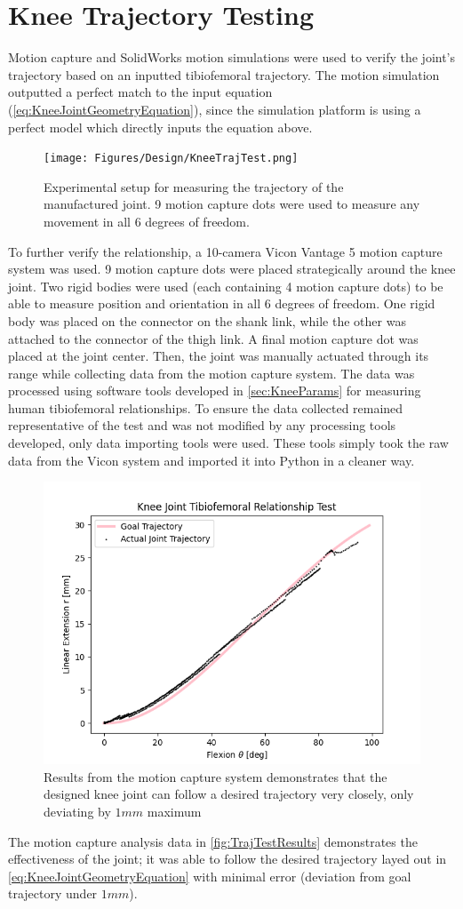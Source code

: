 \section{Knee Trajectory Testing}
Motion capture and SolidWorks motion simulations were used to verify the joint's trajectory based on an inputted tibiofemoral trajectory. The motion simulation outputted a perfect match to the input equation (\autoref{eq:KneeJointGeometryEquation}), since the simulation platform is using a perfect model which directly inputs the equation above.

\begin{figure}[ht!]
    \centering
    \texttt{[image: Figures/Design/KneeTrajTest.png]}
    \caption{Experimental setup for measuring the trajectory of the manufactured joint. 9 motion capture dots were used to measure any movement in all 6 degrees of freedom.}
    \label{fig:TrajTestSetup}
\end{figure}

To further verify the relationship, a 10-camera Vicon Vantage 5 motion capture system was used. 9 motion capture dots were placed strategically around the knee joint. Two rigid bodies were used (each containing 4 motion capture dots) to be able to measure position and orientation in all 6 degrees of freedom. One rigid body was placed on the connector on the shank link, while the other was attached to the connector of the thigh link. A final motion capture dot was placed at the joint center. Then, the joint was manually actuated through its range while collecting data from the motion capture system. The data was processed using software tools developed in \autoref{sec:KneeParams} for measuring human tibiofemoral relationships. To ensure the data collected remained representative of the test and was not modified by any processing tools developed, only data importing tools were used. These tools simply took the raw data from the Vicon system and imported it into Python in a cleaner way.

\begin{figure}[ht!]
    \centering
    \includegraphics[width=0.8\linewidth]{Figures/Design/FlexionExtensionKneeJoint.png}
    \caption{Results from the motion capture system demonstrates that the designed knee joint can follow a desired trajectory very closely, only deviating by \(1mm\) maximum}
    \label{fig:TrajTestResults}
\end{figure}

The motion capture analysis data in \autoref{fig:TrajTestResults} demonstrates the effectiveness of the joint; it was able to follow the desired trajectory layed out in \autoref{eq:KneeJointGeometryEquation} with minimal error (deviation from goal trajectory under \(1mm\)). 